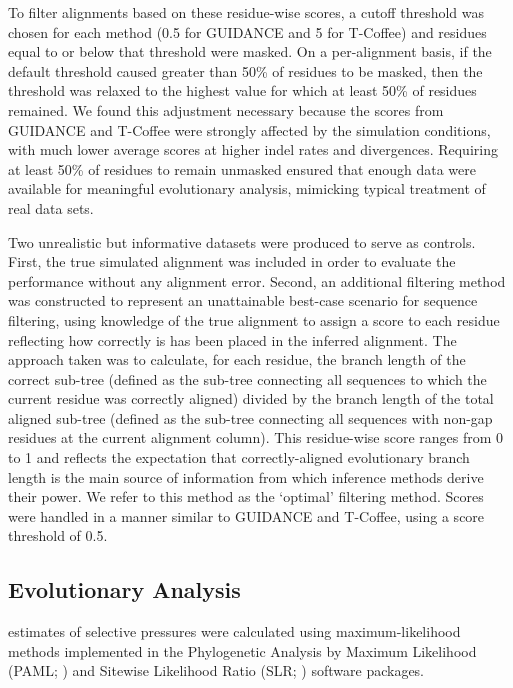 \documentclass{article}
\begin{document}
To filter alignments based on these residue-wise scores, a cutoff
threshold was chosen for each method (0.5 for GUIDANCE and 5 for
T-Coffee) and residues equal to or below that threshold were
masked. On a per-alignment basis, if the default threshold caused
greater than 50\% of residues to be masked, then the threshold was
relaxed to the highest value for which at least 50\% of residues
remained. We found this adjustment necessary because the scores from
GUIDANCE and T-Coffee were strongly affected by the simulation
conditions, with much lower average scores at higher indel rates and
divergences. Requiring at least 50\% of residues to remain unmasked
ensured that enough data were available for meaningful evolutionary
analysis, mimicking typical treatment of real data sets.

Two unrealistic but informative datasets were produced to serve as controls. First,
the true simulated alignment was included in order to evaluate the \sw
performance without any alignment error. Second, an additional
filtering method was constructed to represent an unattainable
best-case scenario for sequence filtering, using knowledge of the true
alignment to assign a score to each residue reflecting how correctly
is has been placed in the inferred alignment. The approach taken was
to calculate, for each residue, the branch length of the correct
sub-tree (defined as the sub-tree connecting all sequences to which
the current residue was correctly aligned) divided by the branch
length of the total aligned sub-tree (defined as the sub-tree
connecting all sequences with non-gap residues at the current
alignment column). This residue-wise score ranges from 0 to 1 and
reflects the expectation that correctly-aligned evolutionary branch
length is the main source of information from which \sw inference
methods derive their power. We refer to this method as the `optimal'
filtering method. Scores were handled in a manner similar to GUIDANCE and
T-Coffee, using a score threshold of 0.5.

\subsection*{\Sw Evolutionary Analysis}

\Sw estimates of selective pressures were calculated using
maximum-likelihood methods implemented in the Phylogenetic Analysis by
Maximum Likelihood (PAML; \citealt{Yang2007PAML}) and Sitewise Likelihood Ratio
(SLR; \citealt{Massingham2005Detecting}) software packages.
\end{document}
